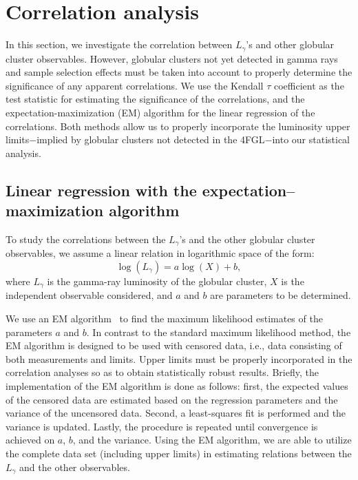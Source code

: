 \documentclass[doublespace,nopageskip]{VTthesis}
\begin{document}
\section{Correlation analysis}\label{sec:correlation}

In this section, we investigate the correlation between $L_\gamma$'s and other globular cluster observables. However, globular clusters not yet detected in gamma rays and sample selection effects must be taken into account to properly determine the significance of any apparent correlations. We use the Kendall $\tau$ coefficient as the test statistic for estimating the significance of the correlations, and the expectation-maximization (EM) algorithm for the linear regression of the correlations. Both methods allow us to properly incorporate the luminosity upper limits$-$implied by globular clusters not detected in the 4FGL$-$into our statistical analysis.

\subsection{Linear regression with the expectation–maximization algorithm}\label{sec:EM}

To study the correlations between the $L_\gamma$'s and the other globular cluster observables, we assume a linear relation in logarithmic space of the form:
\begin{equation}
    \log(L_\gamma) = a\log(X)+b,
\end{equation}
where $L_\gamma$ is the gamma-ray luminosity of the globular cluster, $X$ is the independent observable considered, and $a$ and $b$ are parameters to be determined. 

We use an EM algorithm~\citep{1985ApJ...293..192F,1986ApJ...306..490I,1992BAAS...24..839L} to find the maximum likelihood estimates of the parameters $a$ and $b$. In contrast to the standard maximum likelihood method, the EM algorithm is designed to be used with censored data, i.e., data consisting of both measurements and limits. Upper limits must be properly incorporated in the correlation analyses so as to obtain statistically robust results. Briefly, the implementation of the EM algorithm is done as follows: first, the expected values of the censored data are estimated based on the regression parameters and the variance of the uncensored data. Second, a least-squares fit is performed and the variance is updated. Lastly, the procedure is repeated until convergence is achieved on $a$, $b$, and the variance. Using the EM algorithm, we are able to utilize the complete data set (including upper limits) in estimating relations between the $L_\gamma$ and the other observables.
\end{document}
